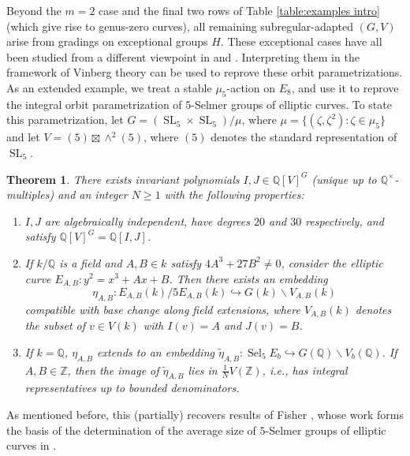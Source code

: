 \documentclass{article} %
\newtheorem{theorem}[proposition]{Theorem}
\numberwithin{equation}{section}
\theoremstyle{definition}
\DeclareMathOperator{\SL}{SL}
\newcommand{\Q}{\mathbb{Q}}
\newcommand{\Z}{\mathbb{Z}}
\DeclareMathOperator{\Sel}{Sel}
\begin{document}
Beyond the $m=2$ case and the final two rows of Table \ref{table:examples intro} (which give rise to genus-zero curves), all remaining subregular-adapted $(G,V)$ arise from gradings on exceptional groups $H$.
These exceptional cases have all been studied from a different viewpoint in \cite{BhargavaHo-coregularspacesgenusone} and \cite{BhargavaHo-2Selmergroupsofsomefamilies}.
Interpreting them in the framework of Vinberg theory can be used to reprove these orbit parametrizations.
As an extended example, we treat a stable $\mu_5$-action on $E_8$, and use it to reprove the integral orbit parametrization of $5$-Selmer groups of elliptic curves.
To state this parametrization, let $G = (\SL_5\times \SL_5)/\mu$, where $\mu=\{ (\zeta, \zeta^2)\colon \zeta\in \mu_5\}$ and let $V = (5)\boxtimes \wedge^2(5)$, where $(5)$ denotes the standard representation of $\SL_5$.




\begin{theorem}\label{theorem:5Selmerintro}
There exists invariant polynomials $I,J \in \Q[V]^G$ (unique up to $\Q^{\times}$-multiples) and an integer $N\geq 1$ with the following properties:
\begin{enumerate}
    \item $I,J$ are algebraically independent, have degrees $20$ and $30$ respectively, and satisfy $\Q[V]^G = \Q[I,J]$.
    \item If $k/\Q$ is a field and $A,B\in k$ satisfy $4A^3 +27B^2\neq0$, consider the elliptic curve $E_{A,B}\colon y^2=  x^3+ A x + B$.
    Then there exists an embedding \[\eta_{A,B}\colon E_{A,B}(k)/5E_{A,B}(k) \hookrightarrow G(k)\backslash V_{A,B}(k)\] compatible with base change along field extensions, where $V_{A,B}(k)$ denotes the subset of $v \in V(k)$ with $I(v) = A$ and $J(v) = B$.
    \item If $k=\Q$, $\eta_{A,B}$ extends to an embedding $\tilde{\eta}_{A,B}\colon \Sel_5 E_b\hookrightarrow G(\Q)\backslash V_b(\Q)$.
    If $A,B \in \Z$, then the image of $\tilde{\eta}_{A,B}$ lies in $\frac{1}{N} V(\Z)$, i.e., has integral representatives up to bounded denominators.
\end{enumerate}
\end{theorem}
As mentioned before, this (partially) recovers results of Fisher \cite{Fisher-invariantsgenusone, Fisher-invarianttheorynormalquinticI, Fisher-invarianttheoryquinticII, Fisher-minimisationreduction5coverings}, whose work forms the basis of the determination of the average size of $5$-Selmer groups of elliptic curves in \cite{BS-5Selmer}.
\end{document}
